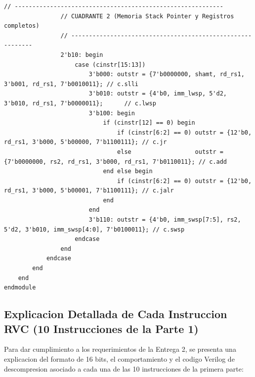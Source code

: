 \documentclass[12pt, a4paper]{article}
\begin{document}
\begin{lstlisting}[style=verilogstyle, caption={Código Verilog del módulo descompresor RVC}]
                // -----------------------------------------------------------
                // CUADRANTE 2 (Memoria Stack Pointer y Registros completos)
                // -----------------------------------------------------------
                2'b10: begin 
                    case (cinstr[15:13])
                        3'b000: outstr = {7'b0000000, shamt, rd_rs1, 3'b001, rd_rs1, 7'b0010011}; // c.slli
                        3'b010: outstr = {4'b0, imm_lwsp, 5'd2, 3'b010, rd_rs1, 7'b0000011};      // c.lwsp
                        3'b100: begin
                            if (cinstr[12] == 0) begin
                                if (cinstr[6:2] == 0) outstr = {12'b0, rd_rs1, 3'b000, 5'b00000, 7'b1100111}; // c.jr
                                else                  outstr = {7'b0000000, rs2, rd_rs1, 3'b000, rd_rs1, 7'b0110011}; // c.add
                            end else begin
                                if (cinstr[6:2] == 0) outstr = {12'b0, rd_rs1, 3'b000, 5'b00001, 7'b1100111}; // c.jalr
                            end
                        end
                        3'b110: outstr = {4'b0, imm_swsp[7:5], rs2, 5'd2, 3'b010, imm_swsp[4:0], 7'b0100011}; // c.swsp
                    endcase
                end
            endcase
        end
    end
endmodule
\end{lstlisting}

\subsection{Explicacion Detallada de Cada Instruccion RVC (10 Instrucciones de la Parte 1)}
Para dar cumplimiento a los requerimientos de la Entrega 2, se presenta una explicacion del formato de 16 bits, el comportamiento y el codigo Verilog de descompresion asociado a cada una de las 10 instrucciones de la primera parte:
\end{document}
